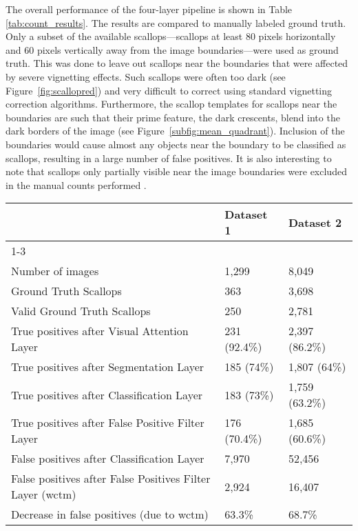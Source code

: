 The overall performance of the four-layer pipeline is shown in Table \ref{tab:count_results}.  
The results are compared to manually labeled ground truth.
Only a subset of the available scallops---scallops at least 80 pixels horizontally and 60 pixels vertically away from the image boundaries---were used as ground truth.
This was done to leave out scallops near the boundaries that were affected by severe vignetting effects. 
Such scallops were often too dark (see Figure~\ref{fig:scallopred}) and very difficult to correct using standard vignetting correction algorithms.
Furthermore, the scallop templates for scallops near the boundaries are such that their prime feature, the dark crescents, blend into the dark borders of the image (see Figure~\ref{subfig:mean_quadrant}). 
Inclusion of the boundaries would cause almost any objects near the boundary to be classified as scallops, resulting in a large number of false positives.
It is also interesting to note that scallops only partially visible near the image boundaries were excluded in the manual counts performed \cite{walker}.

\begin{table*}
\caption{Results of multi-layer scallop classification \label{tab:count_results}}
\begin{center}
\begin{tabular}{lll}
\toprule[1pt]
 & Dataset 1 & Dataset 2\\[2pt]\cline{1-3}\\[-5pt]
Number of images & 1,299 & 8,049\\
Ground Truth Scallops & 363 & 3,698\\
Valid Ground Truth Scallops & 250 & 2,781\\
True positives after Visual Attention Layer & 231 (92.4\%) & 2,397 (86.2\%)\\
True positives after Segmentation Layer & 185 (74\%) & 1,807 (64\%)\\
True positives after Classification Layer & 183 (73\%) & 1,759 (63.2\%)\\
True positives after False Positive Filter Layer & 176 (70.4\%) & 1,685 (60.6\%)\\
False positives after Classification Layer & 7,970 & 52,456\\
False positives after False Positives Filter Layer (\gls{wctm}) & 2,924 & 16,407\\
Decrease in false positives (due to \gls{wctm}) & 63.3\% & 68.7\%\\ \bottomrule
                               \end{tabular}
                               \end{center}
                               \end{table*}      
   
